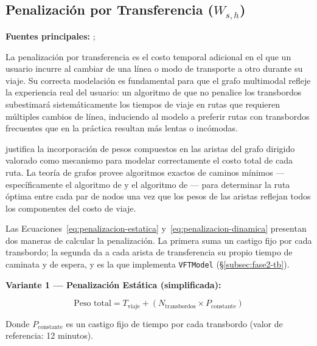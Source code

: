 
\subsection{Penalización por Transferencia \texorpdfstring{($W_{s,h}$)}{(Ws,h)}}
\label{subsec:penalizacion-transferencia}

\textbf{Fuentes principales:} \citet{allauca2023}; \citet{aldous2019optimal}

La penalización por transferencia es el costo temporal adicional en el que un
usuario incurre al cambiar de una línea o modo de transporte a otro durante su
viaje. Su correcta modelación es fundamental para que el grafo multimodal
refleje la experiencia real del usuario: un algoritmo de \dijkstra{} que no
penalice los transbordos subestimará sistemáticamente los tiempos de viaje en
rutas que requieren múltiples cambios de línea, induciendo al modelo a preferir
rutas con transbordos frecuentes que en la práctica resultan más lentas o
incómodas.

\citet{allauca2023} justifica la incorporación de pesos compuestos en las
aristas del grafo dirigido valorado como mecanismo para modelar correctamente el
costo total de cada ruta. La teoría de grafos provee algoritmos exactos de
caminos mínimos ---específicamente el algoritmo de \dijkstra{} y el algoritmo de
\floyd{}--- para determinar la ruta óptima entre cada par de nodos una vez que
los pesos de las aristas reflejan todos los componentes del costo de viaje.

Las Ecuaciones~\eqref{eq:penalizacion-estatica} y~\eqref{eq:penalizacion-dinamica}
presentan dos maneras de calcular la penalización. La primera suma un castigo
fijo por cada transbordo; la segunda da a cada arista de transferencia su propio
tiempo de caminata y de espera, y es la que implementa \texttt{VFTModel}
(§\ref{subsec:fase2-tb}).

\medskip
\noindent\textbf{Variante 1 --- Penalización Estática (simplificada):}

\begin{equation}
    \text{Peso total} = T_{\text{viaje}} + \left(N_{\text{transbordos}}
    \times P_{\text{constante}}\right)
    \label{eq:penalizacion-estatica}
\end{equation}

Donde $P_{\text{constante}}$ es un castigo fijo de tiempo por cada transbordo
(valor de referencia: 12 minutos).

